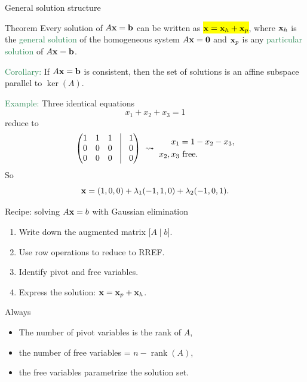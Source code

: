 \documentclass{beamer}
\DeclareMathOperator{\rank}{rank}
\begin{document}
\begin{frame}{General solution structure}

\begin{block}{Theorem}
Every solution of $A{\bf x}={\bf b}$ can be written as
\hl{${\bf x} = {\bf x}_h + {\bf x}_p$}, where ${\bf x}_h$ is the \textcolor{SeaGreen}{general solution} of the homogeneous system $A{\bf x}={\bf 0}$ and ${\bf x}_p$ is any \textcolor{SeaGreen}{particular solution} of $A{\bf x}={\bf b}$.
\end{block}

\medskip
\textcolor{SeaGreen}{Corollary:} If $A{\bf x}={\bf b}$ is consistent, then the set of solutions is an \alert{affine subspace} parallel to $\ker(A)$.

\medskip
\textcolor{SeaGreen}{Example:} Three identical equations
\[
x_1+x_2+x_3=1
\]
reduce to
\[
\begin{pmatrix}
1&1&1 &\vline& 1\\
0&0&0 &\vline& 0\\
0&0&0 &\vline& 0
\end{pmatrix}
\ \leadsto\ 
\begin{aligned}
x_1 &= 1 - x_2 - x_3,\\
x_2,x_3 &\ \text{free}.
\end{aligned}
\]
So
\[
{\bf x} = (1,0,0) + \lambda_1(-1,1,0) + \lambda_2(-1,0,1).
\]

\end{frame}



\begin{frame}{Recipe: solving $A{\bf x}=b$ with Gaussian elimination}
\begin{enumerate}
\item Write down the augmented matrix $\big[A\mid b\big]$.
\item Use row operations to reduce to RREF.
\item Identify pivot and free variables.
\item Express the solution: ${\bf x} = {\bf x}_p + {\bf x}_h$.
\end{enumerate}
\begin{alertblock}{Always}
	\begin{itemize}
		\item The number of pivot variables is the rank of $A$,
		\item the number of free variables = $n-\rank(A)$,
		\item the free variables parametrize the solution set.
	\end{itemize}
\end{alertblock}
\end{frame}
\end{document}
